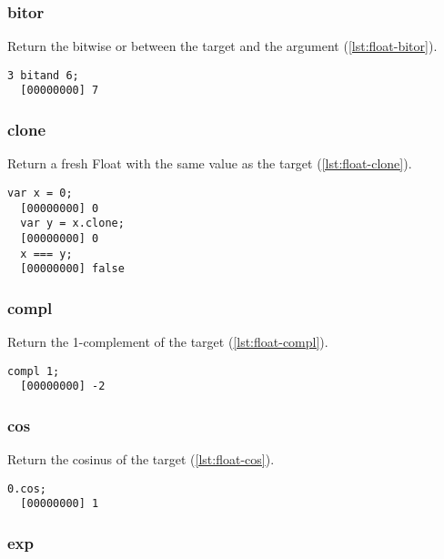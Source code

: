 \subsubsection{bitor}

Return the bitwise or between the target and the argument (\autoref{lst:float-bitor}).

\begin{lstlisting}[caption=Float.bitor, label=lst:float-bitor,
  float=\floatposh]
  3 bitand 6;
  [00000000] 7
\end{lstlisting}

\subsubsection{clone}

Return a fresh Float with the same value as the target (\autoref{lst:float-clone}).

\begin{lstlisting}[caption=Float.clone, label=lst:float-clone,
  float=\floatposh]
  var x = 0;
  [00000000] 0
  var y = x.clone;
  [00000000] 0
  x === y;
  [00000000] false
\end{lstlisting}

\subsubsection{compl}

Return the 1-complement of the target (\autoref{lst:float-compl}).

\begin{lstlisting}[caption=Float.compl, label=lst:float-compl,
  float=\floatposh]
  compl 1;
  [00000000] -2
\end{lstlisting}

\subsubsection{cos}

Return the cosinus of the target (\autoref{lst:float-cos}).

\begin{lstlisting}[caption=Float.cos, label=lst:float-cos,
  float=\floatposh]
  0.cos;
  [00000000] 1
\end{lstlisting}

\subsubsection{exp}

